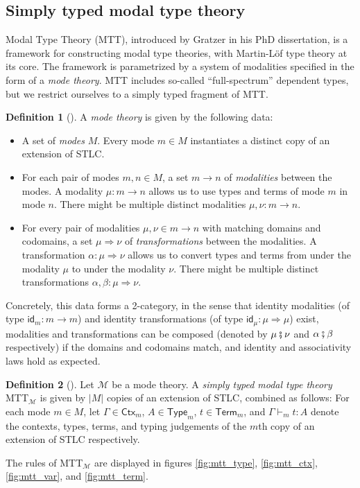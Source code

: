 \documentclass{scrartcl}
\theoremstyle{definition}
\newtheorem{definition}{Definition}
\theoremstyle{plain}
\newcommand{\MTTM}{MTT${}_{\mathcal{M}}$}
\begin{document}
\subsection{Simply typed modal type theory}
Modal Type Theory (MTT)\cite{gratzer2023syntax}, introduced by Gratzer in his
PhD dissertation, is a framework for constructing modal type theories, with
Martin-L\"{of} type theory at its core. The framework is parametrized by a
system of modalities specified in the form of a \emph{mode theory}. MTT
includes so-called ``full-spectrum'' dependent types, but we restrict ourselves
to a simply typed fragment of MTT.
\begin{definition}[{\cite[Chapter 6.1.1]{gratzer2023syntax}}]
  A \emph{mode theory} is given by the following data:
  \begin{itemize}
  \item
    A set of \emph{modes} $M$. Every mode $m \in M$ instantiates a distinct
    copy of an extension of STLC.
  \item
    For each pair of modes $m, n \in M$, a set $m \to n$ of \emph{modalities}
    between the modes. A modality $\mu : m \to n$ allows us to use types and
    terms of mode $m$ in mode $n$. There might be multiple distinct modalities
    $\mu , \nu : m \to n$.
  \item
    For every pair of modalities $\mu, \nu \in m \to n$ with matching domains
    and codomains, a set $\mu \Rightarrow \nu$ of \emph{transformations}
    between the modalities. A transformation $\alpha : \mu \Rightarrow \nu$
    allows us to convert types and terms from under the modality $\mu$ to under
    the modality $\nu$. There might be multiple distinct transformations
    $\alpha, \beta : \mu \Rightarrow \nu$.
  \end{itemize}
  Concretely, this data forms a 2-category, in the sense that identity
  modalities (of type $\textsf{id}_m : m \to m$) and identity transformations
  (of type $\textsf{id}_\mu : \mu \Rightarrow \mu $) exist, modalities and
  transformations can be composed (denoted by $\mu \fatsemi \nu$ and $\alpha
  \fatsemi \beta$ respectively) if the domains and codomains match, and
  identity and associativity laws hold as expected\cite{licata2016adjoint}.
\end{definition}
\begin{definition}[{\cite[following Chapter 6.2]{gratzer2023syntax}}]
  Let $\mathcal{M}$ be a mode theory. A \emph{simply typed modal type theory}
  \MTTM{} is given by $|M|$ copies of an extension of STLC, combined as
  follows: For each mode $m \in M$, let $\Gamma\in\textsf{Ctx}_m$, $A \in
  \textsf{Type}_m$, $t \in \textsf{Term}_m$, and $\Gamma \vdash_m t : A$ denote
  the contexts, types, terms, and typing judgements of the $m$th copy of an
  extension of STLC respectively.
  
  The rules of \MTTM{} are displayed in figures \ref{fig:mtt_type},
  \ref{fig:mtt_ctx}, \ref{fig:mtt_var}, and \ref{fig:mtt_term}.
\end{definition}
\end{document}
